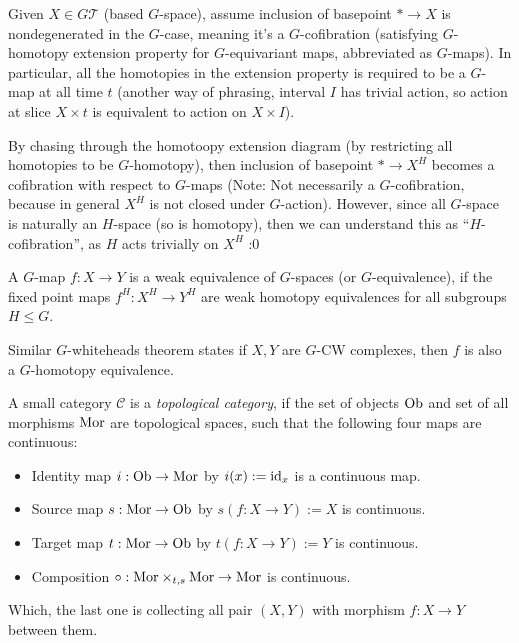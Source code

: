 \documentclass{article}
\begin{document}
\hfil

\begin{defn}
Given $X\in G\mathcal{T}$ (based $G$-space), assume inclusion of basepoint $*\rightarrow X$ is nondegenerated in the $G$-case, meaning it's a $G$-cofibration (satisfying $G$-homotopy extension property for $G$-equivariant maps, abbreviated as $G$-maps). In particular, all the homotopies in the extension property is required to be a $G$-map at all time $t$ (another way of phrasing, interval $I$ has trivial action, so action at slice $X\times t$ is equivalent to action on $X\times I$).

By chasing through the homotoopy extension diagram (by restricting all homotopies to be $G$-homotopy), then inclusion of basepoint $*\rightarrow X^H$ becomes a cofibration with respect to $G$-maps (Note: Not necessarily a $G$-cofibration, because in general $X^H$ is not closed under $G$-action). However, since all $G$-space is naturally an $H$-space (so is homotopy), then we can understand this as ``$H$-cofibration'', as $H$ acts trivially on $X^H$ :0
\end{defn}

\hfil

\begin{defn}
A $G$-map $f:X\rightarrow Y$ is a weak equivalence of $G$-spaces (or $G$-equivalence), if the fixed point maps $f^H:X^H\rightarrow Y^H$ are weak homotopy equivalences for all subgroups $H\leq G$.

Similar $G$-whiteheads theorem states if $X,Y$ are $G$-CW complexes, then $f$ is also a $G$-homotopy equivalence.
\end{defn}

\begin{defn}
    A small category $\mathcal{C}$ is a \emph{topological category}, if the set of objects $\mathrm{Ob}$ and set of all morphisms $\mathrm{Mor}$ are topological spaces, such that the following four maps are continuous:
    \begin{itemize}
        \item Identity map $i:\mathrm{Ob}\rightarrow\mathrm{Mor}$ by $i(x):=\mathrm{id}_x$ is a continuous map.
        \item Source map $s:\mathrm{Mor}\rightarrow\mathrm{Ob}$ by $s(f:X\rightarrow Y):= X$ is continuous.
        \item Target map $t:\mathrm{Mor}\rightarrow\mathrm{Ob}$ by $t(f:X\rightarrow Y):=Y$ is continuous.
        \item Composition $\circ:\mathrm{Mor}\times_{t,s}\mathrm{Mor}\rightarrow\mathrm{Mor}$ is continuous.
    \end{itemize}
    Which, the last one is collecting all pair $(X,Y)$ with morphism $f:X\rightarrow Y$ between them.
\end{defn}
\end{document}
